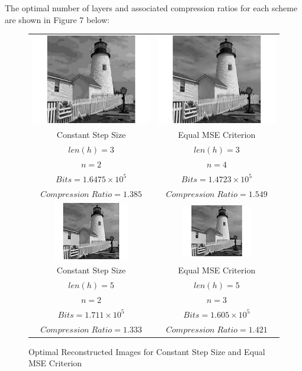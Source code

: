 \documentclass{article}					%
\begin{document}
The optimal number of layers and associated compression ratios for each scheme are shown in Figure 7 below:

\begin{figure}[ht!]
\begin{centering}
\begin{tabular}{c c}
  \includegraphics{20} & \includegraphics{21} \\
  Constant Step Size & Equal MSE Criterion\\
  $len(h) = 3$ & $len(h) = 3$ \\
  $n = 2$ & $n=4$ \\
  $Bits= 1.6475\times 10^5$ & $Bits= 1.4723\times 10^5$ \\
  $Compression\; Ratio = 1.385$ & $Compression\; Ratio = 1.549$\\
  \includegraphics{22} & \includegraphics{23}\\
  Constant Step Size & Equal MSE Criterion\\
  $len(h) = 5$ & $len(h) = 5$\\
  $n = 2$ & $n=3$\\
  $Bits= 1.711\times 10^5$ & $Bits= 1.605\times 10^5$\\
  $Compression\; Ratio = 1.333$ & $Compression\; Ratio = 1.421$\\
\end{tabular}
\caption{Optimal Reconstructed Images for Constant Step Size and Equal MSE Criterion}
\end{centering}
\end{figure}
\end{document}
